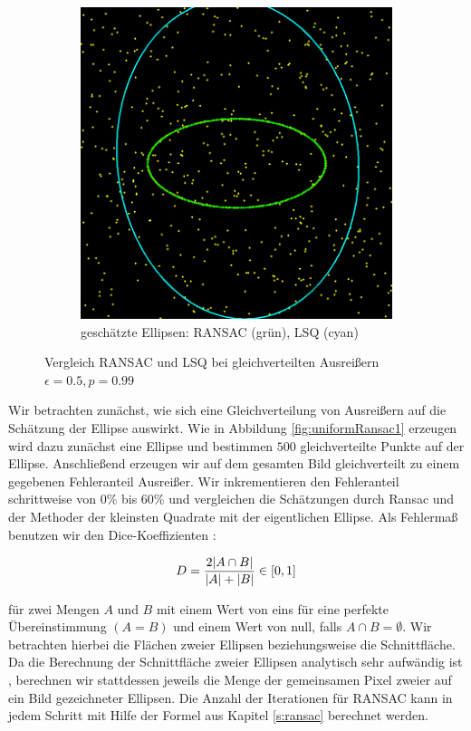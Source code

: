 {\begin{figure}[!htb]
\begin{subfigure}{.5\textwidth}
		\includegraphics[width=.9\textwidth]{images/ransac50_1.png}
		\caption{geschätzte Ellipsen: RANSAC (grün), LSQ (cyan)}
		\label{fig:uniformRansac2}
	\end{subfigure}
	\label{fig:uniformRansac}
	\caption{Vergleich RANSAC und LSQ bei gleichverteilten Ausreißern $\epsilon = 0.5, p = 0.99$}
\end{figure}

Wir betrachten zunächst, wie sich eine Gleichverteilung von Ausreißern auf die Schätzung der Ellipse auswirkt. Wie in Abbildung \ref{fig:uniformRansac1} erzeugen wird dazu zunächst eine Ellipse und bestimmen $500$ gleichverteilte Punkte auf der Ellipse. Anschließend erzeugen wir auf dem gesamten Bild gleichverteilt zu einem gegebenen Fehleranteil Ausreißer. Wir inkrementieren den Fehleranteil schrittweise von 0\% bis 60\% und vergleichen die Schätzungen durch Ransac und der Methoder der kleinsten Quadrate mit der eigentlichen Ellipse. Als Fehlermaß benutzen wir den Dice-Koeffizienten \cite{Dice1945}:

\[
	D = \frac{2\lvert A\cap B\rvert}{\lvert A\rvert + \lvert B\rvert} \in [0, 1]
\]

für zwei Mengen $A$ und $B$ mit einem Wert von eins für eine perfekte Übereinstimmung $(A = B)$ und einem Wert von null, falls $A\cap B = \emptyset$. Wir betrachten hierbei die Flächen zweier Ellipsen beziehungsweise die Schnittfläche. Da die Berechnung der Schnittfläche zweier Ellipsen analytisch sehr aufwändig ist \cite{Eberly2008}, berechnen wir stattdessen jeweils die Menge der gemeinsamen Pixel zweier auf ein Bild gezeichneter Ellipsen.
Die Anzahl der Iterationen für RANSAC kann in jedem Schritt mit Hilfe der Formel aus Kapitel \ref{s:ransac} berechnet werden.

}

